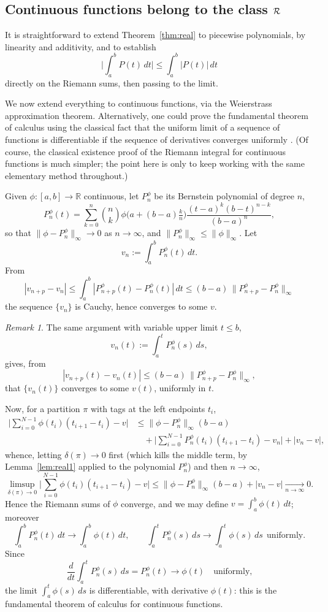 \documentclass[11pt,fleqn]{article}
\def\R{\mathbb R}
\theoremstyle{plain}
\theoremstyle{remark}
\newtheorem{remark}[thm]{Remark}
\begin{document}
\subsection{Continuous functions belong to the class ${\cal R}$}\label{sec:cont-riemann}

It is straightforward to extend Theorem~\ref{thm:real} to piecewise
polynomials, by linearity and additivity, and to establish
\[
\Big|\int_a^b P(t)\,dt\Big|\le\int_a^b|P(t)|\,dt
\]
directly on the Riemann sums, then passing to the limit.

We now extend everything to continuous functions, via the Weierstrass
approximation theorem. Alternatively, one could prove the fundamental
theorem of calculus using the classical fact that the uniform limit of a
sequence of functions is differentiable if the sequence of derivatives
converges uniformly \cite[Theorem 7.17]{R}. (Of course, the classical
existence proof of the Riemann integral for continuous functions is much
simpler; the point here is only to keep working with the same elementary
method throughout.)

Given $\phi\colon[a,b]\to\R$ continuous, let $P_n^\phi$ be its Bernstein
polynomial of degree $n$,
\[
P_n^\phi(t)=\sum_{k=0}^n\binom nk\phi\Big(a+(b-a)\tfrac kn\Big)
\frac{(t-a)^k(b-t)^{n-k}}{(b-a)^n},
\]
so that $\|\phi-P_n^\phi\|_\infty\to0$ as $n\to\infty$, and
$\|P_n^\phi\|_\infty\le\|\phi\|_\infty$. Let
\[
v_n:=\int_a^b P_n^\phi(t)\,dt.
\]
From
\[
|v_{n+p}-v_n|\le\int_a^b|P_{n+p}^\phi(t)-P_n^\phi(t)|\,dt
\le(b-a)\,\|P_{n+p}^\phi-P_n^\phi\|_\infty
\]
the sequence $\{v_n\}$ is Cauchy, hence converges to some $v$.

\begin{remark}
The same argument with variable upper limit $t\le b$,
\[
v_n(t):=\int_a^t P_n^\phi(s)\,ds,
\]
gives, from
\[
|v_{n+p}(t)-v_n(t)|\le(b-a)\,\|P_{n+p}^\phi-P_n^\phi\|_\infty,
\]
that $\{v_n(t)\}$ converges to some $v(t)$, uniformly in $t$.
\end{remark}

Now, for a partition $\pi$ with tags at the left endpoints $t_i$,
\begin{align*}
\Big|\sum_{i=0}^{N-1}\phi(t_i)(t_{i+1}-t_i)-v\Big|
&\le\|\phi-P_n^\phi\|_\infty(b-a)\\
&\quad+\Big|\sum_{i=0}^{N-1}P_n^\phi(t_i)(t_{i+1}-t_i)-v_n\Big|+|v_n-v|,
\end{align*}
whence, letting $\delta(\pi)\to0$ first (which kills the middle term, by
Lemma~\ref{lem:real1} applied to the polynomial $P_n^\phi$) and then
$n\to\infty$,
\[
\limsup_{\delta(\pi)\to0}\Big|\sum_{i=0}^{N-1}\phi(t_i)(t_{i+1}-t_i)-v\Big|
\le\|\phi-P_n^\phi\|_\infty(b-a)+|v_n-v|\xrightarrow[n\to\infty]{}0.
\]
Hence the Riemann sums of $\phi$ converge, and we may define
$v=\int_a^b\phi(t)\,dt$; moreover
\[
\int_a^b P_n^\phi(t)\,dt\longrightarrow\int_a^b\phi(t)\,dt,\qquad
\int_a^t P_n^\phi(s)\,ds\longrightarrow\int_a^t\phi(s)\,ds\ \ \text{uniformly}.
\]
Since
\[
\frac{d}{dt}\int_a^tP_n^\phi(s)\,ds=P_n^\phi(t)\longrightarrow\phi(t)\quad\text{uniformly,}
\]
the limit $\int_a^t\phi(s)\,ds$ is differentiable, with derivative
$\phi(t)$: this is the fundamental theorem of calculus for continuous
functions.
\end{document}

